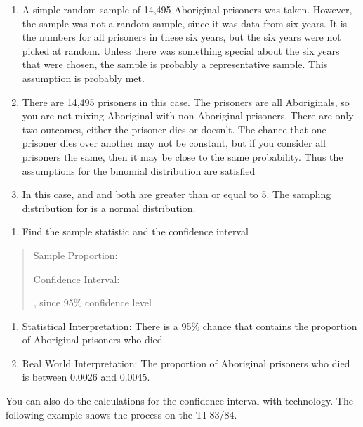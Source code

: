 \documentclass[]{book}
\providecommand{\tightlist}{%
  \setlength{\itemsep}{0pt}\setlength{\parskip}{0pt}}
\begin{document}
\begin{enumerate}
\def\labelenumi{\alph{enumi}.}
\item
  A simple random sample of 14,495 Aboriginal prisoners was taken.
  However, the sample was not a random sample, since it was data from
  six years. It is the numbers for all prisoners in these six years,
  but the six years were not picked at random. Unless there was
  something special about the six years that were chosen, the sample
  is probably a representative sample. This assumption is probably
  met.
\item
  There are 14,495 prisoners in this case. The prisoners are all
  Aboriginals, so you are not mixing Aboriginal with non-Aboriginal
  prisoners. There are only two outcomes, either the prisoner dies or
  doesn't. The chance that one prisoner dies over another may not be
  constant, but if you consider all prisoners the same, then it may be
  close to the same probability. Thus the assumptions for the binomial
  distribution are satisfied
\item
  In this case, and and both are greater than or equal to 5. The
  sampling distribution for is a normal distribution.
\end{enumerate}

\begin{enumerate}
\def\labelenumi{\arabic{enumi}.}
\setcounter{enumi}{2}
\tightlist
\item
  Find the sample statistic and the confidence interval
\end{enumerate}

\begin{quote}
Sample Proportion:

Confidence Interval:

, since 95\% confidence level
\end{quote}

\begin{enumerate}
\def\labelenumi{\arabic{enumi}.}
\setcounter{enumi}{3}
\item
  Statistical Interpretation: There is a 95\% chance that contains the
  proportion of Aboriginal prisoners who died.
\item
  Real World Interpretation: The proportion of Aboriginal prisoners
  who died is between 0.0026 and 0.0045.
\end{enumerate}

You can also do the calculations for the confidence interval with
technology. The following example shows the process on the TI-83/84.
\end{document}
